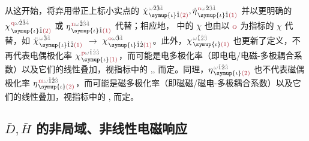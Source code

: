 从这开始，将弃用带正上标小实点的 $\dot{\chi}^{\;\! \mathcolor{gray}{\omega} \hat{2} \hat{3} \mathcolor{gray}{\hat{4}}}_{\;\! \symup{\iota} \hat{1} \textcolor{Maroon}{(2)}}, \dot{\eta}^{\;\! \textcolor{Maroon}{\text{n}} \mathcolor{gray}{\omega} \hat{2} \mathcolor{gray}{\hat{3} \hat{4}}}_{\;\! \symup{\iota} \hat{1} \textcolor{Maroon}{(1)}}$ 并以更明确的 $\chi^{\;\! \textcolor{Maroon}{\text{q}} \mathcolor{gray}{\omega} \hat{2} \hat{3} \mathcolor{gray}{\hat{4}}}_{\;\! \symup{\iota} \hat{1} \textcolor{Maroon}{(2)}}$ 或 $\eta^{\;\! \textcolor{Maroon}{\text{n}} \mathcolor{gray}{\omega} \hat{2} \mathcolor{gray}{\hat{3} \hat{4}}}_{\;\! \symup{\iota} \hat{1} \textcolor{Maroon}{(1)}}$ 代替；相应地， 中的 $\ddot{\chi}$ 也由以 $\textcolor{Maroon}{\text{o}}$ 为指标的 $\chi$ 代替，如 $\ddot{\chi}^{\;\! \mathcolor{gray}{\omega} \hat{3} \mathcolor{gray}{\hat{4}}}_{\;\! \symup{\iota} \hat{1} \hat{2} \textcolor{Maroon}{(1)}}$ $\longrightarrow$ $\chi^{\;\! \textcolor{Maroon}{\text{o}} \mathcolor{gray}{\omega} \hat{3} \mathcolor{gray}{\hat{4}}}_{\;\! \symup{\iota} \hat{1} \hat{2} \textcolor{Maroon}{(1)}}$。此外，$\chi^{\;\! \mathcolor{gray}{\omega} \hat{1} \mathcolor{gray}{\hat{2} \hat{3}}}_{\;\! \symup{\iota} \textcolor{Maroon}{(1)}}$ 也更新了定义，不再代表电偶极化率 $\chi^{\;\! \textcolor{Maroon}{\text{p}} \mathcolor{gray}{\omega} \hat{1} \mathcolor{gray}{\hat{2} \hat{3}}}_{\;\! \symup{\iota} \textcolor{Maroon}{(1)}}$，而可能是电多极化率（即电电/电磁-多极耦合系数）以及它们的线性叠加，视指标中的 \textcolor{Maroon}{},\textcolor{Maroon}{},\textcolor{Maroon}{} 而定。同理，$\eta^{\;\! \mathcolor{gray}{\omega} \hat{1} \hat{2} \mathcolor{gray}{\hat{3}}}_{\;\! \symup{\iota} \textcolor{Maroon}{(2)}}$ 也不代表磁偶极化率 $\eta^{\;\! \textcolor{Maroon}{\text{m}} \mathcolor{gray}{\omega} \hat{1} \hat{2} \mathcolor{gray}{\hat{3}}}_{\;\! \symup{\iota} \textcolor{Maroon}{(2)}}$，而可能是磁多极化率（即磁磁/磁电-多极耦合系数）以及它们的线性叠加，视指标中的 \textcolor{Maroon}{},\textcolor{Maroon}{} 而定。

\vspace*{-4.0em}

\subsection{$\bar{D},\bar{H}$ 的非局域、非线性电磁响应}\label{ssec:DH-nonlinear}

